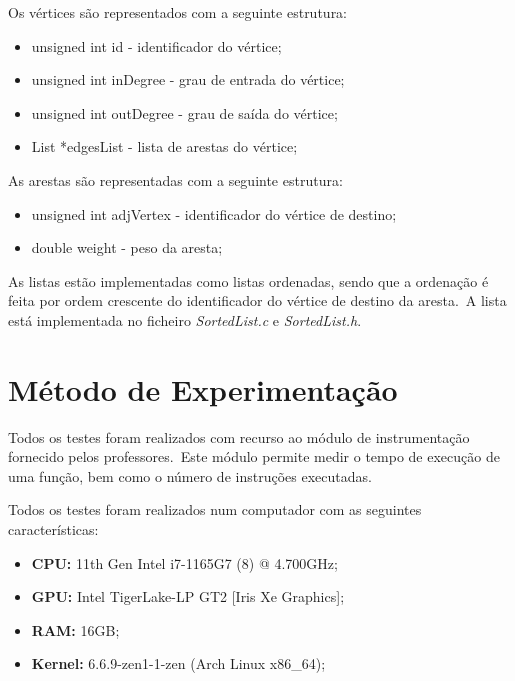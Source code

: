 \vspace*{5mm}

Os vértices são representados com a seguinte estrutura:

\begin{itemize}
    \item unsigned int id - identificador do vértice;
    \item unsigned int inDegree - grau de entrada do vértice;
    \item unsigned int outDegree - grau de saída do vértice;
    \item List *edgesList - lista de arestas do vértice;
\end{itemize}

\vspace*{5mm}

As arestas são representadas com a seguinte estrutura:

\begin{itemize}
    \item unsigned int adjVertex - identificador do vértice de destino;
    \item double weight - peso da aresta;
\end{itemize}

\vspace*{5mm}

As listas estão implementadas como listas ordenadas, sendo que a ordenação é feita por ordem crescente do identificador do vértice de destino da aresta.\ A lista está implementada no ficheiro \textit{SortedList.c} e \textit{SortedList.h}.

\section{Método de Experimentação}
\label{sec:introducao:metodo-de-experimentacao}

Todos os testes foram realizados com recurso ao módulo de instrumentação fornecido pelos professores.\ Este módulo permite medir o tempo de execução de uma função, bem como o número de instruções executadas.

Todos os testes foram realizados num computador com as seguintes características:

\begin{itemize}
    \item \textbf{CPU:} 11th Gen Intel i7-1165G7 (8) @ 4.700GHz;
    \item \textbf{GPU:} Intel TigerLake-LP GT2 [Iris Xe Graphics];
    \item \textbf{RAM:} 16GB;
    \item \textbf{Kernel:} 6.6.9-zen1-1-zen (Arch Linux x86\_64);
\end{itemize}